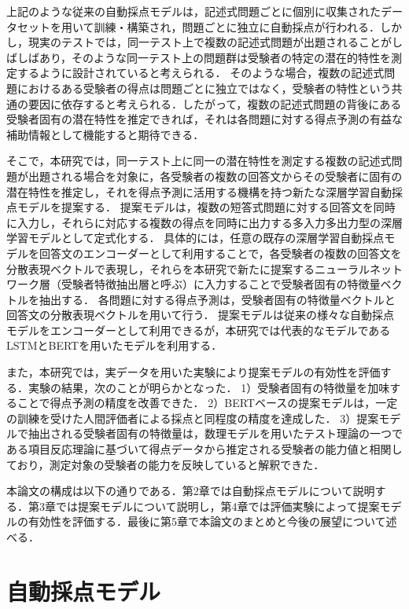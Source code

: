 \documentclass[a4paper,12pt,oneside,openany]{jsbook}
\begin{document}
上記のような従来の自動採点モデルは，記述式問題ごとに個別に収集されたデータセットを用いて訓練・構築され，問題ごとに独立に自動採点が行われる．しかし，現実のテストでは，同一テスト上で複数の記述式問題が出題されることがしばしばあり，そのような同一テスト上の問題群は受験者の特定の潜在的特性を測定するように設計されていると考えられる．
そのような場合，複数の記述式問題におけるある受験者の得点は問題ごとに独立ではなく，受験者の特性という共通の要因に依存すると考えられる．したがって，複数の記述式問題の背後にある受験者固有の潜在特性を推定できれば，それは各問題に対する得点予測の有益な補助情報として機能すると期待できる．

そこで，本研究では，同一テスト上に同一の潜在特性を測定する複数の記述式問題が出題される場合を対象に，各受験者の複数の回答文からその受験者に固有の潜在特性を推定し，それを得点予測に活用する機構を持つ新たな深層学習自動採点モデルを提案する．
提案モデルは，複数の短答式問題に対する回答文を同時に入力し，それらに対応する複数の得点を同時に出力する多入力多出力型の深層学習モデルとして定式化する．
具体的には，任意の既存の深層学習自動採点モデルを回答文のエンコーダーとして利用することで，各受験者の複数の回答文を分散表現ベクトルで表現し，それらを本研究で新たに提案するニューラルネットワーク層（受験者特徴抽出層と呼ぶ）に入力することで受験者固有の特徴量ベクトルを抽出する．
各問題に対する得点予測は，受験者固有の特徴量ベクトルと回答文の分散表現ベクトルを用いて行う．
提案モデルは従来の様々な自動採点モデルをエンコーダーとして利用できるが，本研究では代表的なモデルであるLSTMとBERTを用いたモデルを利用する．

また，本研究では，実データを用いた実験により提案モデルの有効性を評価する．実験の結果，次のことが明らかとなった．
1）受験者固有の特徴量を加味することで得点予測の精度を改善できた．
2）BERTベースの提案モデルは，一定の訓練を受けた人間評価者による採点と同程度の精度を達成した．
3）提案モデルで抽出される受験者固有の特徴量は，数理モデルを用いたテスト理論の一つである項目反応理論に基づいて得点データから推定される受験者の能力値と相関しており，測定対象の受験者の能力を反映していると解釈できた．

本論文の構成は以下の通りである．第2章では自動採点モデルについて説明する．第3章では提案モデルについて説明し，第4章では評価実験によって提案モデルの有効性を評価する．最後に第5章で本論文のまとめと今後の展望について述べる．


\chapter{自動採点モデル}
\end{document}
